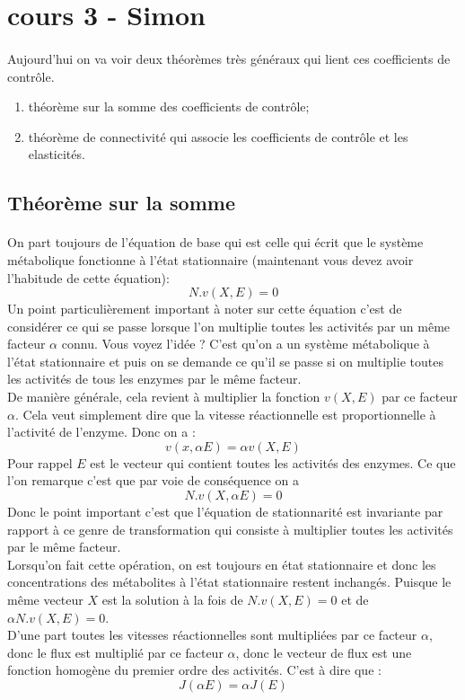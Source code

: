 \renewcommand{\labelitemi}{$\bullet$}
\renewcommand{\labelitemii}{$\cdot$}
\renewcommand{\labelitemiii}{$\diamond$}
\renewcommand{\labelitemiv}{$\ast$}

\section{cours 3 - Simon}

\paragraph{}Aujourd'hui on va voir deux théorèmes très généraux qui lient ces coefficients de contrôle.
\begin{enumerate}
\item théorème sur la somme des coefficients de contrôle;
\item théorème de connectivité qui associe les coefficients de contrôle et les elasticités.
\end{enumerate}

\subsection{Théorème sur la somme}

\paragraph{}On part toujours de l'équation de base qui est celle qui écrit que le système métabolique fonctionne à l'état stationnaire (maintenant vous devez avoir l'habitude de cette équation):
$$N.v(X,E)=0$$
Un point particulièrement important à noter sur cette équation c'est de considérer ce qui se passe lorsque l'on multiplie toutes les activités par un même facteur $\alpha$ connu. Vous voyez l'idée ? C'est qu'on a un système métabolique à l'état stationnaire et puis on se demande ce qu'il se passe si on multiplie toutes les activités de tous les enzymes par le même facteur. \\
De manière générale, cela revient à multiplier la fonction $v(X,E)$ par ce facteur $\alpha$. Cela veut simplement dire que la vitesse réactionnelle est proportionnelle à l'activité de l'enzyme. Donc on a :
$$v(x,\alpha E) = \alpha v(X,E)$$
Pour rappel $E$ est le vecteur qui contient toutes les activités des enzymes. Ce que l'on remarque c'est que par voie de conséquence on a 
$$N.v(X,\alpha E)=0$$
Donc le point important c'est que l'équation de stationnarité est invariante par rapport à ce genre de transformation qui consiste à multiplier toutes les activités par le même facteur.\\
Lorsqu'on fait cette opération, on est toujours en état stationnaire et donc les concentrations des métabolites à l'état stationnaire restent inchangés. Puisque le même vecteur $X$ est la solution à la fois de $N.v(X,E)=0$ et de $\alpha N.v(X,E)=0$.\\
D'une part toutes les vitesses réactionnelles sont multipliées par ce facteur $\alpha$, donc le flux est multiplié par ce facteur $\alpha$, donc le vecteur de flux est une fonction homogène du premier ordre des activités. C'est à dire que :
$$J(\alpha E) = \alpha J(E)$$


